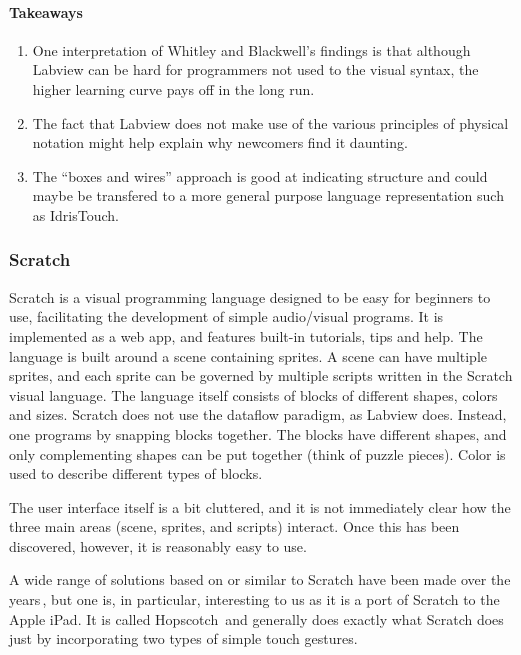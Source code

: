 \paragraph{Takeaways}
\begin{enumerate}
	\item One interpretation of Whitley and Blackwell's findings  is that although Labview can be hard for programmers not used to the visual syntax, the higher learning curve pays off in the long run.
	\item The fact that Labview does not make use of the various principles of physical notation might help explain why newcomers find it daunting.
	\item The ``boxes and wires'' approach is good at indicating structure and could maybe be transfered to a more general purpose language representation such as IdrisTouch.
\end{enumerate}


\subsubsection{Scratch}
\label{subsub:Scratch}
Scratch is a visual programming language designed to be easy for beginners to use, facilitating the development of simple audio/visual programs. It is implemented as a web app, and features built-in tutorials, tips and help.
The language is built around a scene containing sprites. A scene can have multiple sprites, and each sprite can be governed by multiple scripts written in the Scratch visual language. The language itself consists of blocks of different shapes, colors and sizes. Scratch does not use the dataflow paradigm, as Labview does. Instead, one programs by snapping blocks together. The blocks have different shapes, and only complementing shapes can be put together (think of puzzle pieces). Color is used to describe different types of blocks.

The user interface itself is a bit cluttered, and it is not immediately clear how the three main areas (scene, sprites, and scripts) interact. Once this has been discovered, however, it is reasonably easy to use. 

A wide range of solutions based on or similar to Scratch have been made over the years\,\cite{hosick2014}, but one is, in particular, interesting to us as it is a port of Scratch to the Apple iPad. It is called Hopscotch\,\cite{hopscotch} and generally does exactly what Scratch does just by incorporating two types of simple touch gestures.

